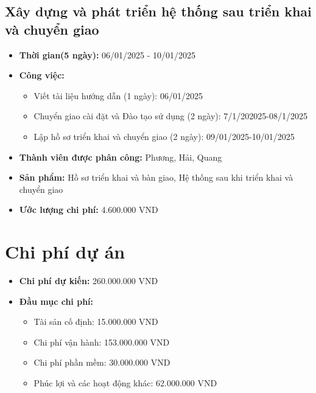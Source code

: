 \subsection{Xây dựng và phát triển hệ thống sau triển khai và chuyển giao}
\begin{itemize}
    \item \textbf{Thời gian(5 ngày):} 06/01/2025 - 10/01/2025
    \item \textbf{Công việc:}
    \begin{itemize}
        \item Viết tài liệu hướng dẫn (1 ngày): 06/01/2025
        \item Chuyển giao cài đặt và Đào tạo sử dụng (2 ngày): 7/1/202025-08/1/2025
        \item Lập hồ sơ triển khai và chuyển giao (2 ngày):  09/01/2025-10/01/2025
    \end{itemize}
    \item \textbf{Thành viên được phân công:} Phương, Hải, Quang
    \item \textbf{Sản phẩm:} Hồ sơ triển khai và bàn giao, Hệ thống sau khi triển khai và chuyển giao
    \item \textbf{Ước lượng chi phí:} 4.600.000 VND
\end{itemize}

\section{Chi phí dự án}
\begin{itemize}
    \item \textbf{Chi phí dự kiến:} 260.000.000 VND
    \item \textbf{Đầu mục chi phí:}
    \begin{itemize}
        \item Tài sản cố định: 15.000.000 VND
        \item Chi phí vận hành: 153.000.000 VND
        \item Chi phí phần mềm: 30.000.000 VND
        \item Phúc lợi và các hoạt động khác: 62.000.000 VND
    \end{itemize}
\end{itemize}